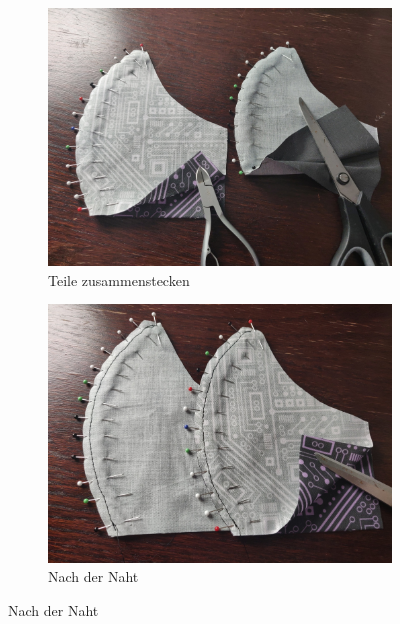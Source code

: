 \documentclass[12pt,parskip=full]{scrartcl}
\begin{document}
\begin{figure}[ht]
    \vspace{0.5cm}
    \centering
    \begin{subfigure}{0.48\textwidth}
        \centering
        \includegraphics[width = \linewidth]{Pictures/04_ButterflySeam/Butterfly_01_resized.jpg}
        \caption{Teile zusammenstecken}
        \label{Butterfly1}
    \end{subfigure}
    \begin{subfigure}{0.48\textwidth}
        \centering
        \includegraphics[width = \linewidth]{Pictures/04_ButterflySeam/Butterfly_02_resized.jpg}
        \caption{Nach der Naht}
        \label{Butterfly2}
    \end{subfigure}

\end{figure}
\end{document}
